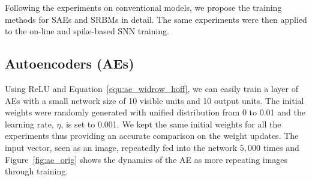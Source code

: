 Following the experiments on conventional models, we propose the training methods for SAEs and SRBMs in detail.
The same experiments were then applied to the on-line and spike-based SNN training.

\subsection{Autoencoders (AEs)}
\label{sec:ae}
Using ReLU and Equation~\ref{equ:ae_widrow_hoff}, we can easily train a layer of AEs with a small network size of 10 visible units and 10 output units.
The initial weights were randomly generated with unified distribution from 0 to 0.01 and the learning rate, $\eta$, is set to 0.001.
We kept the same initial weights for all the experiments thus providing an accurate comparison on the weight updates.
The input vector, seen as an image, repeatedly fed into the network $5,000$ times and Figure~\ref{fig:ae_orig} shows the dynamics of the AE as more repeating images \protect{} \protect{} through training.

